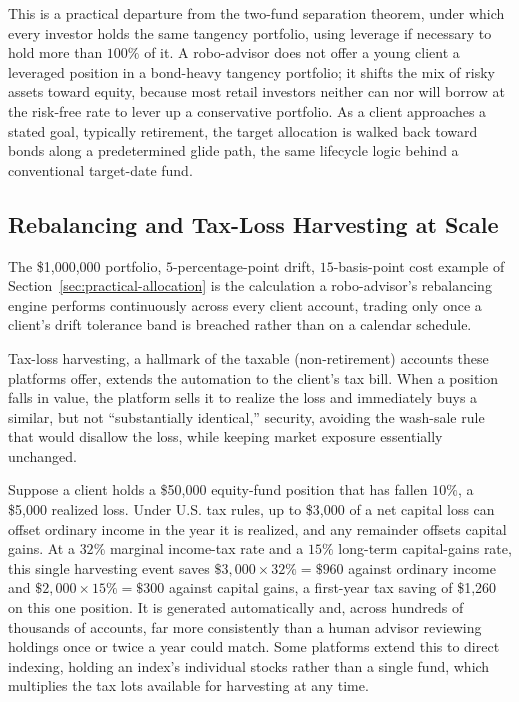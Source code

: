 \documentclass[../ai_in_finance]{subfiles}
\begin{document}
This is a practical departure from the two-fund separation theorem, under which every investor holds the same tangency portfolio, using leverage if necessary to hold more than $100\%$ of it. A robo-advisor does not offer a young client a leveraged position in a bond-heavy tangency portfolio; it shifts the mix of risky assets toward equity, because most retail investors neither can nor will borrow at the risk-free rate to lever up a conservative portfolio.
As a client approaches a stated goal, typically retirement, the target allocation is walked back toward bonds along a predetermined glide path, the same lifecycle logic behind a conventional target-date fund.

\subsection{Rebalancing and Tax-Loss Harvesting at Scale}
\label{sec:robo-rebalancing-tlh}

The \$1,000,000 portfolio, $5$-percentage-point drift, $15$-basis-point cost example of Section~\ref{sec:practical-allocation} is the calculation a robo-advisor's rebalancing engine performs continuously across every client account, trading only once a client's drift tolerance band is breached rather than on a calendar schedule.

Tax-loss harvesting, a hallmark of the taxable (non-retirement) accounts these platforms offer, extends the automation to the client's tax bill. When a position falls in value, the platform sells it to realize the loss and immediately buys a similar, but not ``substantially identical,'' security, avoiding the wash-sale rule that would disallow the loss, while keeping market exposure essentially unchanged.

Suppose a client holds a \$50,000 equity-fund position that has fallen $10\%$, a \$5,000 realized loss. Under U.S. tax rules, up to \$3,000 of a net capital loss can offset ordinary income in the year it is realized, and any remainder offsets capital gains. At a $32\%$ marginal income-tax rate and a $15\%$ long-term capital-gains rate, this single harvesting event saves $\$3{,}000 \times 32\% = \$960$ against ordinary income and $\$2{,}000 \times 15\% = \$300$ against capital gains, a first-year tax saving of \$1,260 on this one position. It is generated automatically and, across hundreds of thousands of accounts, far more consistently than a human advisor reviewing holdings once or twice a year could match.
Some platforms extend this to direct indexing, holding an index's individual stocks rather than a single fund, which multiplies the tax lots available for harvesting at any time.
\end{document}
